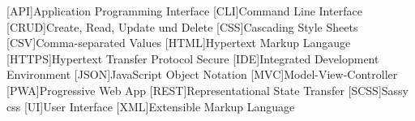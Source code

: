 \begin{acronym}[MMMMMM]
 
 	[API]{Application Programming Interface}
	[CLI]{Command Line Interface}
	[CRUD]{Create, Read, Update und Delete}
	[CSS]{Cascading Style Sheets}
	[CSV]{Comma-separated Values}
	[HTML]{Hypertext Markup Langauge}
	[HTTPS]{Hypertext Transfer Protocol Secure}
	[IDE]{Integrated Development Environment}
	[JSON]{JavaScript Object Notation}
	[MVC]{Model-View-Controller}
	[PWA]{Progressive Web App}
	[REST]{Representational State Transfer}
	[SCSS]{Sassy \acs{css}}
	[UI]{User Interface}
	[XML]{Extensible Markup Language}

\end{acronym}
